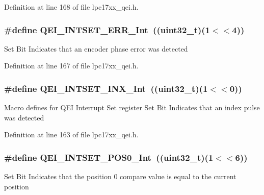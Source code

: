 \-Definition at line 168 of file lpc17xx\-\_\-qei.\-h.

\hypertarget{group___q_e_i___private___macros_gad6de145b6933e8ae9e09f6228fe0eb29}{
\subsubsection[{\-Q\-E\-I\-\_\-\-I\-N\-T\-S\-E\-T\-\_\-\-E\-R\-R\-\_\-\-Int}]{\setlength{\rightskip}{0pt plus 5cm}\#define {\bf \-Q\-E\-I\-\_\-\-I\-N\-T\-S\-E\-T\-\_\-\-E\-R\-R\-\_\-\-Int}~((uint32\-\_\-t)(1$<$$<$4))}}\label{group___q_e_i___private___macros_gad6de145b6933e8ae9e09f6228fe0eb29}
\-Set \-Bit \-Indicates that an encoder phase error was detected 

\-Definition at line 167 of file lpc17xx\-\_\-qei.\-h.

\hypertarget{group___q_e_i___private___macros_ga3a9010f19b5eb6864df6f27686194ffd}{
\subsubsection[{\-Q\-E\-I\-\_\-\-I\-N\-T\-S\-E\-T\-\_\-\-I\-N\-X\-\_\-\-Int}]{\setlength{\rightskip}{0pt plus 5cm}\#define {\bf \-Q\-E\-I\-\_\-\-I\-N\-T\-S\-E\-T\-\_\-\-I\-N\-X\-\_\-\-Int}~((uint32\-\_\-t)(1$<$$<$0))}}\label{group___q_e_i___private___macros_ga3a9010f19b5eb6864df6f27686194ffd}
\-Macro defines for \-Q\-E\-I \-Interrupt \-Set register \-Set \-Bit \-Indicates that an index pulse was detected 

\-Definition at line 163 of file lpc17xx\-\_\-qei.\-h.

\hypertarget{group___q_e_i___private___macros_ga624b7728ca0b6138f0de1a90f4effca9}{
\subsubsection[{\-Q\-E\-I\-\_\-\-I\-N\-T\-S\-E\-T\-\_\-\-P\-O\-S0\-\_\-\-Int}]{\setlength{\rightskip}{0pt plus 5cm}\#define {\bf \-Q\-E\-I\-\_\-\-I\-N\-T\-S\-E\-T\-\_\-\-P\-O\-S0\-\_\-\-Int}~((uint32\-\_\-t)(1$<$$<$6))}}\label{group___q_e_i___private___macros_ga624b7728ca0b6138f0de1a90f4effca9}
\-Set \-Bit \-Indicates that the position 0 compare value is equal to the current position 

